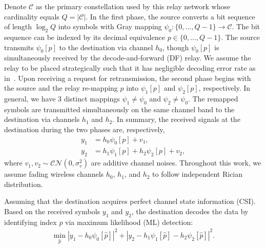 \documentclass[journal]{IEEEtran}
\begin{document}
Denote $\mathcal{C}$ as the primary constellation used by this relay
network whose cardinality equals $Q = |\mathcal{C}|$. In the first phase, the
source converts a bit sequence of length $\log_2Q$ into symbols with Gray mapping $\psi_0:
\{0,\ldots,Q - 1\}\rightarrow \mathcal{C}$. The bit sequence can be indexed by
its decimal equivalence $p\in \{0,\ldots,Q - 1\}$. The source transmits
$\psi_0[p]$ to the destination via channel $h_0$, though $\psi_0[p]$ is
simultaneously received by the decode-and-forward (DF) relay. We assume the
relay to be placed strategically such that it has negligible decoding error rate
as in~\cite{ryu2011ber, kim2009design}. Upon receiving a request for
retransmission, the second phase begins with the source and the relay re-mapping
$p$ into $\psi_1[p]$ and $\psi_2[p]$, respectively. In general, we have 3
distinct mappings $\psi_1\not=\psi_0$ and $\psi_2\not=\psi_0$. The remapped
symbols are transmitted simultaneously on the same channel band to the
destination via channels $h_1$ and $h_2$. In summary, the received signals at
the destination during the two phases are, respectively,
\begin{subequations}
    \begin{align}
       y_1 & = h_0\psi_0[p] + v_1, \\
       y_2 & = h_1\psi_1[p] + h_2\psi_2[p] + v_2,
    \end{align}
\end{subequations}
where $v_1, v_2\sim\mathcal{CN}(0,\sigma_v^2)$ are additive channel noises.
Throughout this work, we assume fading wireless channels $h_0$, $h_1$, and $h_2$ 
to follow independent Rician distribution.

Assuming that the destination acquires perfect channel state information (CSI).
Based on the received symbols $y_1$ and $y_2$,  the destination decodes the data
by identifying index $p$ via maximum likelihood (ML) detection:
\begin{align}
    \min_{\hat{p}} |y_1 - h_0\psi_0[\hat{p}]|^2 + |y_2-
    h_1\psi_1[\hat{p}] - h_2\psi_2[\hat{p}]|^2.
    \label{eq:ML}
\end{align}

%
%
\end{document}
